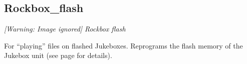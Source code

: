 \subsection{Rockbox\_flash}
{\centering\itshape
  [Warning: Image ignored] %
 \newline
Rockbox flash
\par}

For ``playing''  files on flashed Jukeboxes. Reprograms the flash memory of
the Jukebox unit (see page \pageref{ref:Rockboxinflash} for details).


